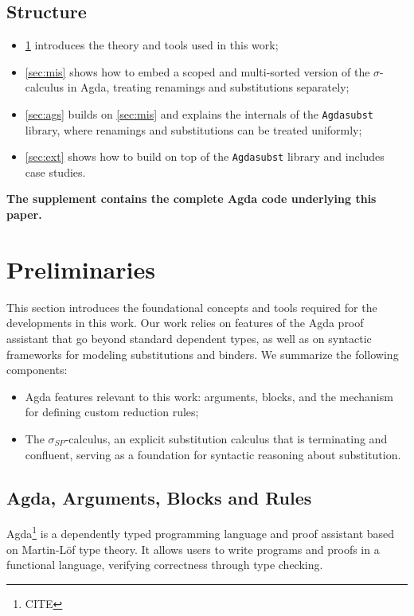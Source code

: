 \documentclass[screen,nonacm]{acmart}
\begin{document}
\subsection*{Structure}

\begin{itemize}
      \item \cref{sec:pre} introduces the theory and tools used in this work;
      \item \cref{sec:mis} shows how to embed a scoped and multi-sorted version of the $\sigma$-calculus in Agda, treating renamings and substitutions separately;
      \item \cref{sec:ags} builds on \cref{sec:mis} and explains the internals of the \texttt{Agdasubst} library, where renamings and substitutions can be treated uniformly;
      \item \cref{sec:ext} shows how to build on top of the \texttt{Agdasubst} library and includes case studies.
\end{itemize}

\textbf{The supplement contains the complete Agda code underlying this paper.}

\section{Preliminaries}\label{sec:pre}
This section introduces the foundational concepts and tools required for the
developments in this work. Our work relies on features of the Agda proof
assistant that go beyond standard dependent types, as well as on syntactic
frameworks for modeling substitutions and binders. We summarize the following
components:

\begin{itemize}
      \item Agda features relevant to this work:  arguments,
             blocks, and the  mechanism for
            defining custom reduction rules;
      \item The $\sigma_{SP}$-calculus, an explicit substitution calculus that is
            terminating and confluent, serving as a foundation for syntactic reasoning
            about substitution.
\end{itemize}

\subsection{Agda,  Arguments,  Blocks and 
      Rules}\label{sec:pre-agd} Agda\footnote{CITE} is a dependently typed
programming language and proof assistant based on Martin-Löf type theory. It
allows users to write programs and proofs in a functional language, verifying
correctness through type checking.
\end{document}
